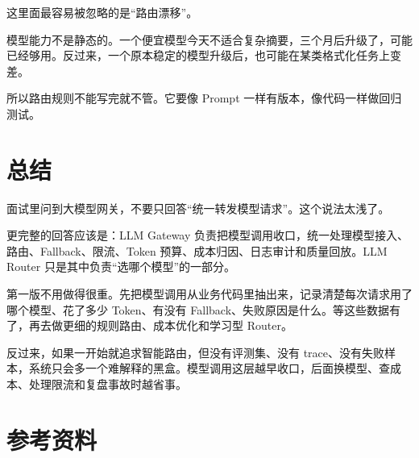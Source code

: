 \documentclass[10pt,a4paper]{ctexart}
\begin{document}
这里面最容易被忽略的是“路由漂移”。



模型能力不是静态的。一个便宜模型今天不适合复杂摘要，三个月后升级了，可能已经够用。反过来，一个原本稳定的模型升级后，也可能在某类格式化任务上变差。



所以路由规则不能写完就不管。它要像 Prompt 一样有版本，像代码一样做回归测试。



\section{总结}


面试里问到大模型网关，不要只回答“统一转发模型请求”。这个说法太浅了。



更完整的回答应该是：LLM Gateway 负责把模型调用收口，统一处理模型接入、路由、Fallback、限流、Token 预算、成本归因、日志审计和质量回放。LLM Router 只是其中负责“选哪个模型”的一部分。



第一版不用做得很重。先把模型调用从业务代码里抽出来，记录清楚每次请求用了哪个模型、花了多少 Token、有没有 Fallback、失败原因是什么。等这些数据有了，再去做更细的规则路由、成本优化和学习型 Router。



反过来，如果一开始就追求智能路由，但没有评测集、没有 trace、没有失败样本，系统只会多一个难解释的黑盒。模型调用这层越早收口，后面换模型、查成本、处理限流和复盘事故时越省事。



\section{参考资料}
\end{document}
